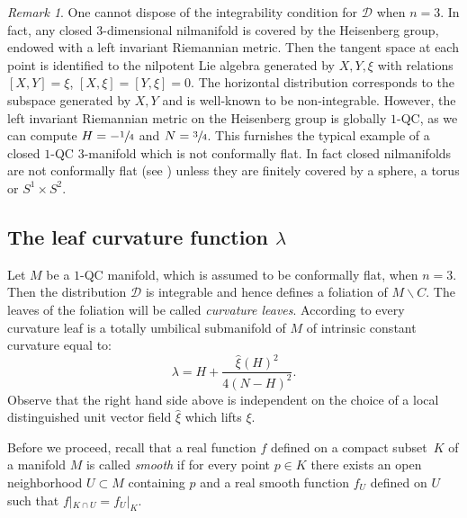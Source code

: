 \documentclass[10pt]{amsart}
\let\mathcal\mathscr
\let\moins\smallsetminus
\theoremstyle{definition}
\theoremstyle{remark}
\newtheorem{remark}[theorem]{Remark}
\numberwithin{equation}{section}
\begin{document}
\begin{remark}
One cannot dispose of the integrability condition for $\mathcal D$ when $n=3$.
In fact, any closed $3$\nobreakdash-dimensional nilmanifold
is covered by the Heisenberg group, endowed with a
left invariant Riemannian metric. Then
the tangent space at each point is identified to the
nilpotent Lie algebra generated by $X,Y,\xi$ with relations
$[X,Y]=\xi$, $[X,\xi]=[Y,\xi]=0$. The
horizontal distribution corresponds to the subspace
generated by $X,Y$ and is well-known to be non-integrable.
However, the left invariant Riemannian metric on the Heisenberg
group is globally $1$-QC, as we can compute
$H=\nobreak-\sfrac{1}{4}$ and $N=\sfrac{3}{4}$. This furnishes the
typical example of a closed $1$-QC $3$\nobreakdash-manifold which is not conformally flat.
In fact closed nilmanifolds are not conformally flat
(see \cite{Go}) unless they are finitely
covered by a sphere, a torus or $S^1\times S^2$.
\end{remark}

\subsection{The leaf curvature function $\lambda$}\label{leafcurv}
Let $M$ be a $1$-QC manifold, which is assumed to be conformally flat, when $n=3$.
Then the distribution $\mathcal D$ is integrable and hence defines a foliation of $M\moins C$. The leaves
of the foliation will be called \emph{curvature leaves}.
According to \cite{BP,GM} every curvature leaf is a totally umbilical submanifold
of $M$ of intrinsic constant curvature equal to:
\[\lambda=H + \frac{\widehat{\xi}(H)^2}{4(N-H)^2}.\]
Observe that the right hand side above is independent on the choice of a local distinguished unit vector field
$\widehat{\xi}$ which lifts $\xi$.

Before we proceed, recall that a real function $f$ defined on a compact subset~$K$ of a manifold $M$ is
called \emph{smooth} if for every point $p\in K$ there exists an open neighborhood $U\subset M$ containing $p$
and a real smooth function $f_U$ defined on $U$ such that $f|_{K\cap U}=f_U|_K$.
\end{document}

